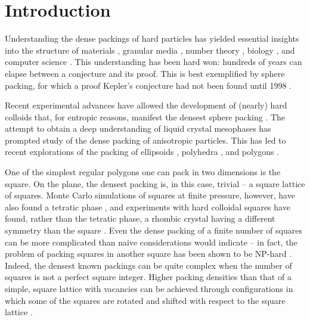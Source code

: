 \documentclass{umthesis}          %
\begin{document}
\section{Introduction}

Understanding the dense packings of hard particles has yielded essential insights into the structure of materials \cite{Bernal1964,Zallen1983,Torquato2002,Chaikin2000}, granular media \cite{Torquato2002,Mehta1994}, number theory \cite{COHNa,Conway1999}, biology 
\cite{Gevertz2008,Purohit2003}, and computer science \cite{Johnson1974,Lodi2002}. This understanding has been hard won: hundreds of years can elapse between a conjecture and its proof. This is best exemplified by sphere packing, for which a proof Kepler's conjecture had not been found until 1998 \cite{HALESa}.

Recent experimental advances have allowed the development of (nearly) hard colloids that, for entropic reasons, manifest the densest sphere packing \cite{Pusey1986}. The attempt to obtain a deep understanding of liquid crystal mesophases has prompted study of the dense packing of anisotropic particles. This has led to recent explorations of the packing of ellipsoids \cite{Donev2004,Ras2011}, polyhedra \cite{ROAN,BAKER}, and polygons \cite{STROOBANTS}.

One of the simplest regular polygons one can pack in two dimensions is the square. On the plane, the densest packing is, in this case, trivial -- a square lattice of squares. Monte Carlo simulations of squares at finite pressure, however, have also found a tetratic phase \cite{Donev2006,Wojciechowski2004}, and experiments with hard colloidal squares have found, rather than the tetratic phase, a rhombic crystal having a different symmetry than the square \cite{Zhao2011}. Even the dense packing of a finite number of squares can be more complicated than naive considerations would indicate -- in fact, the problem of packing squares in another square has been shown to be NP-hard \cite{Leung1990}. Indeed, the densest known packings can be quite complex \cite{ERDOS1975,Friedman2002} when the number of squares is not a perfect square integer. Higher packing densities than that of a simple, square lattice with vacancies can be achieved through configurations in which some of the squares are rotated and shifted with respect to the square lattice \cite{Friedman2002}.
\end{document}
